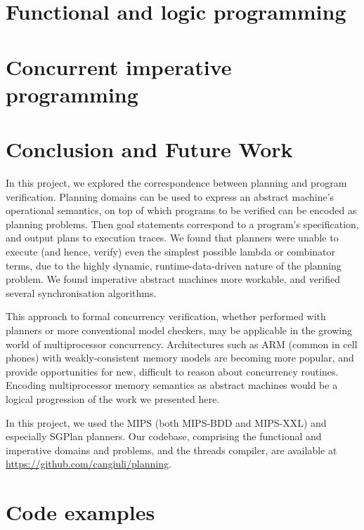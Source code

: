 \documentclass{article}
\begin{document}
\section{Functional and logic programming}



\section{Concurrent imperative programming}



\section{Conclusion and Future Work}

In this project, we explored the correspondence between planning and program verification. Planning domains can be used to express an abstract machine's operational semantics, on top of which programs to be verified can be encoded as planning problems. Then goal statements correspond to a program's specification, and output plans to execution traces. We found that planners were unable to execute (and hence, verify) even the simplest possible lambda or combinator terms, due to the highly dynamic, runtime-data-driven nature of the planning problem. We found imperative abstract machines more workable, and verified several synchronisation algorithms.

This approach to formal concurrency verification, whether performed with planners or more conventional model checkers, may be applicable in the growing world of multiprocessor concurrency. Architectures such as ARM (common in cell phones) with weakly-consistent memory models are becoming more popular, and provide opportunities for new, difficult to reason about concurrency routines. Encoding multiprocessor memory semantics as abstract machines would be a logical progression of the work we presented here.

In this project, we used the MIPS (both MIPS-BDD and MIPS-XXL) and especially SGPlan planners. Our codebase, comprising the functional and imperative domains and problems, and the threads compiler, are available at \url{https://github.com/cangiuli/planning}.

{}


\newpage

\appendix
\section{Code examples}

\end{document}
